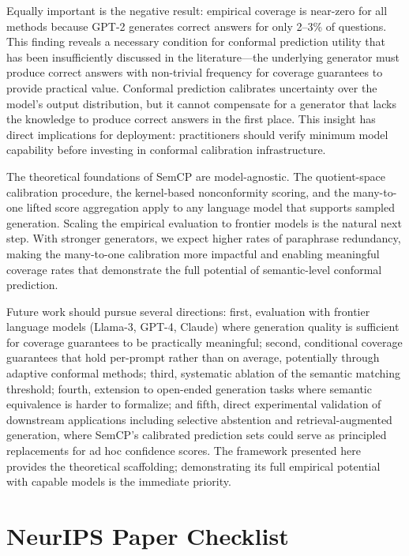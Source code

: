 \documentclass{article}
\begin{document}
Equally important is the negative result: empirical coverage is near-zero for all methods because GPT-2 generates correct answers for only 2--3\% of questions. This finding reveals a necessary condition for conformal prediction utility that has been insufficiently discussed in the literature---the underlying generator must produce correct answers with non-trivial frequency for coverage guarantees to provide practical value. Conformal prediction calibrates uncertainty over the model's output distribution, but it cannot compensate for a generator that lacks the knowledge to produce correct answers in the first place. This insight has direct implications for deployment: practitioners should verify minimum model capability before investing in conformal calibration infrastructure.

The theoretical foundations of SemCP are model-agnostic. The quotient-space calibration procedure, the kernel-based nonconformity scoring, and the many-to-one lifted score aggregation apply to any language model that supports sampled generation. Scaling the empirical evaluation to frontier models is the natural next step. With stronger generators, we expect higher rates of paraphrase redundancy, making the many-to-one calibration more impactful and enabling meaningful coverage rates that demonstrate the full potential of semantic-level conformal prediction.

Future work should pursue several directions: first, evaluation with frontier language models (Llama-3, GPT-4, Claude) where generation quality is sufficient for coverage guarantees to be practically meaningful; second, conditional coverage guarantees that hold per-prompt rather than on average, potentially through adaptive conformal methods; third, systematic ablation of the semantic matching threshold; fourth, extension to open-ended generation tasks where semantic equivalence is harder to formalize; and fifth, direct experimental validation of downstream applications including selective abstention and retrieval-augmented generation, where SemCP's calibrated prediction sets could serve as principled replacements for ad hoc confidence scores. The framework presented here provides the theoretical scaffolding; demonstrating its full empirical potential with capable models is the immediate priority.




\appendix

\section*{NeurIPS Paper Checklist}
\end{document}
